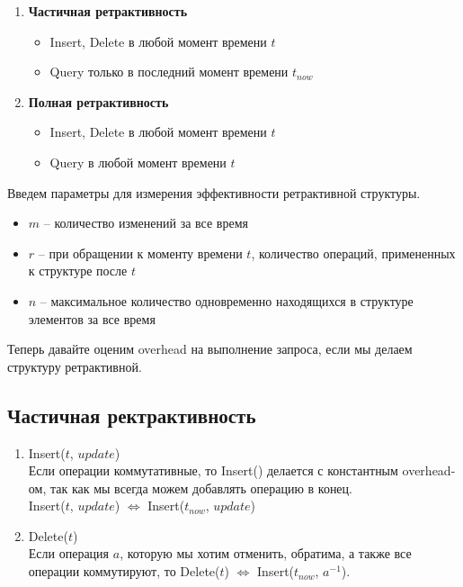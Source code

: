 \begin{enumerate}

\item {\bf Частичная ретрактивность}

\begin{itemize}

\item Insert, Delete в любой момент времени $t$
\item Query только в последний момент времени $t_{now}$

\end{itemize}

\item {\bf Полная ретрактивность}

\begin{itemize}

\item Insert, Delete в любой момент времени $t$
\item Query в любой момент времени $t$

\end{itemize}

\end{enumerate}

Введем параметры для измерения эффективности ретрактивной структуры.

\begin{itemize}

\item $m$ -- количество изменений за все время
\item $r$ -- при обращении к моменту времени $t$, количество операций, примененных к структуре после $t$
\item $n$ -- максимальное количество одновременно находящихся в структуре элементов за все время

\end{itemize}

Теперь давайте оценим overhead на выполнение запроса, если мы делаем структуру ретрактивной.

\subsection*{Частичная ректрактивность}

\begin{enumerate}

\item Insert($t$, $update$)\\ 
Если операции коммутативные, то Insert() делается с константным overhead-ом, так как мы всегда можем добавлять операцию в конец.\\
Insert($t$, $update$) $\Leftrightarrow$ Insert($t_{now}$, $update$)

\item Delete($t$)\\
Если операция $a$, которую мы хотим отменить, обратима, а также все операции коммутируют, то Delete($t$) $\Leftrightarrow$ Insert($t_{now}$, $a^{-1}$).

\end{enumerate}

